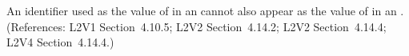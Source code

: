 An identifier used as the value of  in an \EventAssignment
cannot also appear as the value of  in an \AssignmentRule.
(References: L2V1 Section~4.10.5; L2V2 Section~4.14.2; L2V2 Section~4.14.4; L2V4 Section~4.14.4.)
